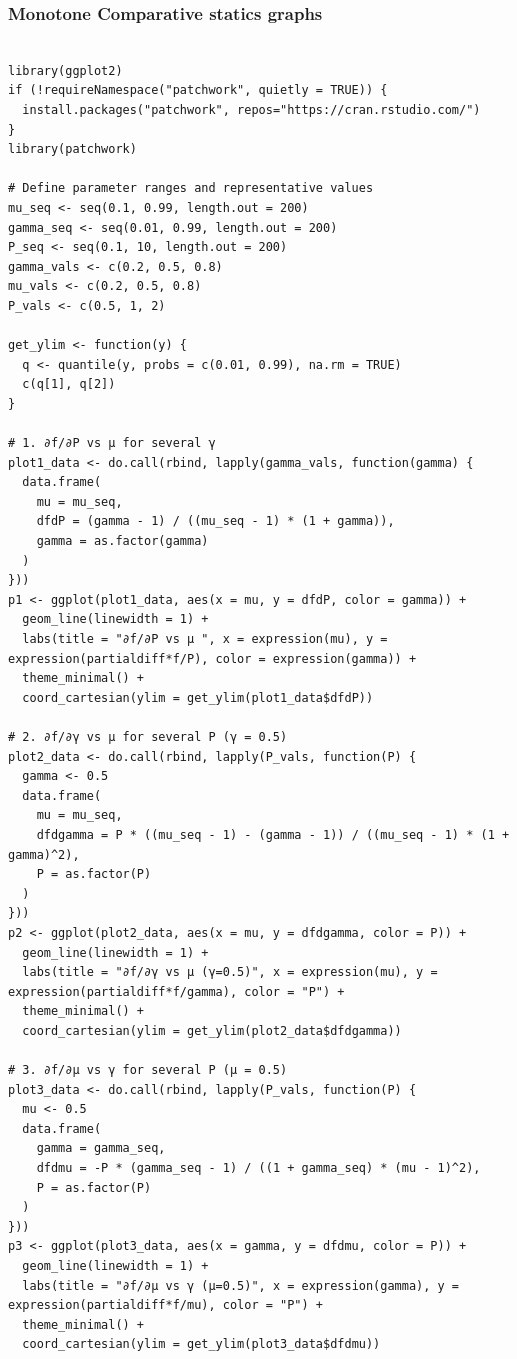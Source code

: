 \documentclass{article}
\begin{document}
\subsubsection{Monotone Comparative statics graphs}
\begin{lstlisting}[style=R]  

library(ggplot2)  
if (!requireNamespace("patchwork", quietly = TRUE)) {  
  install.packages("patchwork", repos="https://cran.rstudio.com/")  
}  
library(patchwork)  

# Define parameter ranges and representative values  
mu_seq <- seq(0.1, 0.99, length.out = 200)  
gamma_seq <- seq(0.01, 0.99, length.out = 200)  
P_seq <- seq(0.1, 10, length.out = 200)  
gamma_vals <- c(0.2, 0.5, 0.8)  
mu_vals <- c(0.2, 0.5, 0.8)  
P_vals <- c(0.5, 1, 2)  

get_ylim <- function(y) {  
  q <- quantile(y, probs = c(0.01, 0.99), na.rm = TRUE)  
  c(q[1], q[2])  
}  

# 1. ∂f/∂P vs μ for several γ  
plot1_data <- do.call(rbind, lapply(gamma_vals, function(gamma) {  
  data.frame(  
    mu = mu_seq,  
    dfdP = (gamma - 1) / ((mu_seq - 1) * (1 + gamma)),  
    gamma = as.factor(gamma)  
  )  
}))  
p1 <- ggplot(plot1_data, aes(x = mu, y = dfdP, color = gamma)) +  
  geom_line(linewidth = 1) +  
  labs(title = "∂f/∂P vs μ ", x = expression(mu), y = expression(partialdiff*f/P), color = expression(gamma)) +  
  theme_minimal() +  
  coord_cartesian(ylim = get_ylim(plot1_data$dfdP))  

# 2. ∂f/∂γ vs μ for several P (γ = 0.5)  
plot2_data <- do.call(rbind, lapply(P_vals, function(P) {  
  gamma <- 0.5  
  data.frame(  
    mu = mu_seq,  
    dfdgamma = P * ((mu_seq - 1) - (gamma - 1)) / ((mu_seq - 1) * (1 + gamma)^2),  
    P = as.factor(P)  
  )  
}))  
p2 <- ggplot(plot2_data, aes(x = mu, y = dfdgamma, color = P)) +  
  geom_line(linewidth = 1) +  
  labs(title = "∂f/∂γ vs μ (γ=0.5)", x = expression(mu), y = expression(partialdiff*f/gamma), color = "P") +  
  theme_minimal() +  
  coord_cartesian(ylim = get_ylim(plot2_data$dfdgamma))  

# 3. ∂f/∂μ vs γ for several P (μ = 0.5)  
plot3_data <- do.call(rbind, lapply(P_vals, function(P) {  
  mu <- 0.5  
  data.frame(  
    gamma = gamma_seq,  
    dfdmu = -P * (gamma_seq - 1) / ((1 + gamma_seq) * (mu - 1)^2),  
    P = as.factor(P)  
  )  
}))  
p3 <- ggplot(plot3_data, aes(x = gamma, y = dfdmu, color = P)) +  
  geom_line(linewidth = 1) +  
  labs(title = "∂f/∂μ vs γ (μ=0.5)", x = expression(gamma), y = expression(partialdiff*f/mu), color = "P") +  
  theme_minimal() +  
  coord_cartesian(ylim = get_ylim(plot3_data$dfdmu))  


\end{lstlisting}
\end{document}
